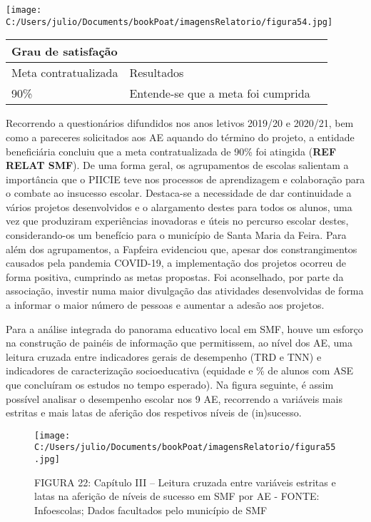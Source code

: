 \documentclass[
]{book}
\begin{document}
\texttt{[image: C:/Users/julio/Documents/bookPoat/imagensRelatorio/figura54.jpg]}

\begin{longtable}[]{@{}lll@{}}
\toprule()
Grau de satisfação & & \\
\midrule()
\endhead
Meta contratualizada & Resultados & \\
90\% & Entende-se que a meta foi cumprida & \\
\bottomrule()
\end{longtable}

Recorrendo a questionários difundidos nos anos letivos 2019/20 e 2020/21, bem como a pareceres solicitados aos AE aquando do término do projeto, a entidade beneficiária concluiu que a meta contratualizada de 90\% foi atingida (\textbf{REF RELAT SMF}). De uma forma geral, os agrupamentos de escolas salientam a importância que o PIICIE teve nos processos de aprendizagem e colaboração para o combate ao insucesso escolar. Destaca-se a necessidade de dar continuidade a vários projetos desenvolvidos e o alargamento destes para todos os alunos, uma vez que produziram experiências inovadoras e úteis no percurso escolar destes, considerando-os um benefício para o município de Santa Maria da Feira. Para além dos agrupamentos, a Fapfeira evidenciou que, apesar dos constrangimentos causados pela pandemia COVID-19, a implementação dos projetos ocorreu de forma positiva, cumprindo as metas propostas. Foi aconselhado, por parte da associação, investir numa maior divulgação das atividades desenvolvidas de forma a informar o maior número de pessoas e aumentar a adesão aos projetos.

Para a análise integrada do panorama educativo local em SMF, houve um esforço na construção de painéis de informação que permitissem, ao nível dos AE, uma leitura cruzada entre indicadores gerais de desempenho (TRD e TNN) e indicadores de caracterização socioeducativa (equidade e \% de alunos com ASE que concluíram os estudos no tempo esperado). Na figura seguinte, é assim possível analisar o desempenho escolar nos 9 AE, recorrendo a variáveis mais estritas e mais latas de aferição dos respetivos níveis de (in)sucesso.

\begin{figure}
\centering
\texttt{[image: C:/Users/julio/Documents/bookPoat/imagensRelatorio/figura55.jpg]}
\caption{FIGURA 22: Capítulo III -- Leitura cruzada entre variáveis estritas e latas na aferição de níveis de sucesso em SMF por AE - FONTE: Infoescolas; Dados facultados pelo município de SMF}
\end{figure}
\end{document}

